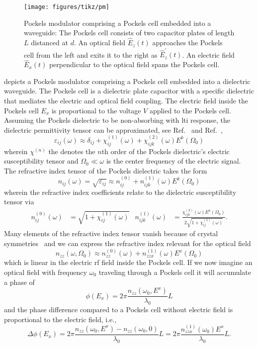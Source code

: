 \begin{figure}[htb]
    \centering
    \texttt{[image: figures/tikz/pm]}
    \caption{Pockels modulator comprising a Pockels cell embedded into a waveguide: The Pockels cell consists of two capacitor plates of length $L$ distanced at $d$. An optical field $\hat{E}_z(t)$ approaches the Pockels cell from the left and exits it to the right as $\hat{E}_z^\prime(t)$. An electric field $\hat{E}_x(t)$ perpendicular to the optical field spans the Pockels cell.}\label{fig:pm}
\end{figure}
 depicts a Pockels modulator comprising a Pockels cell embedded into a dielectric waveguide.
The Pockels cell is a dielectric plate capacitor with a specific dielectric that mediates the electric and optical field coupling.
The electric field inside the Pockels cell $E_x$ is proportional to the voltage $V$ applied to the Pockels cell.
Assuming the Pockels dielectric to be non-absorbing with \gls{lti} response, the dielectric permittivity tensor can be approximated, see Ref.~\cite{Murti2014} and Ref.~\cite[p.~1070]{Mandel1995},
\begin{equation}
	\varepsilon_{ij}(\omega)
	\approx
	\delta_{ij}
	+
	\chi_{ij}^{(1)}(\omega)
	+
	\chi_{ijk}^{(2)}(\omega)
	E^k(\Omega_0)
\end{equation}
wherein $\chi^{(n)}$ the denotes the $n$th order of the Pockels dielectric's electric susceptibility tensor and $\Omega_0\ll\omega$ is the center frequency of the electric signal.
The refractive index tensor of the Pockels dielectric takes the form
\begin{equation}
	n_{ij}(\omega)
	=
	\sqrt{\varepsilon_{ij}}
	\approx
	n_{ij}^{(0)}
	+
	n_{ijk}^{(1)}(\omega)
	E^k(\Omega_0)
\end{equation}
wherein the refractive index coefficients relate to the dielectric susceptibility tensor via~\cite{Rerat2020}
\begin{align}
	n^{(0)}_{ij}(\omega)
	&=
	\sqrt{1+\chi^{(1)}_{ij}(\omega)}
	&
	n^{(1)}_{ijk}(\omega)
	&=
	\frac{\chi^{(2)}_{ijk}(\omega)
	E^k(\Omega_0)}{2\sqrt{1+\chi^{(1)}_{ij}(\omega)}}
	.
\end{align}
Many elements of the refractive index tensor vanish because of crystal symmetries~\cite[p.~237]{Yariv1984} and we can express the refractive index relevant for the optical field
\begin{equation}
	n_{zz}(\omega,\Omega_0)
	\approx
	n^{(0)}_{zz}(\omega)
	+
	n^{(1)}_{zzx}(\omega)
	E^x(\Omega_0)
\end{equation}
which is linear in the electric \gls{rf} field inside the Pockels cell.
If we now imagine an optical field with frequency $\omega_0$ traveling through a Pockels cell it will accumulate a phase of
\begin{equation}
	\phi(E_x)
	=
	2\pi\frac{n_{zz}(\omega_0,E^x)}{\lambda_0}L
\end{equation} 
and the phase difference compared to a Pockels cell without electric field is proportional to the electric field, i.e.,
\begin{equation}
	\Delta\phi(E_x)
	=
	2\pi\frac{n_{zz}(\omega_0,E^x)-n_{zz}(\omega_0,0)}{\lambda_0}L
	=
	2\pi\frac{n_{zzx}^{(1)}(\omega_0)E^x}{\lambda_0}L
	.
\end{equation}

